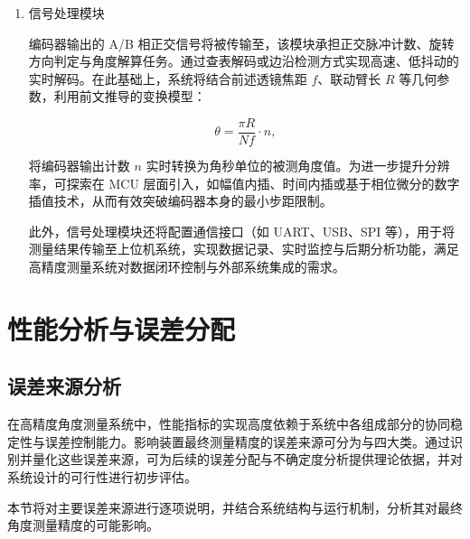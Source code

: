 \begin{enumerate}
	编码器采用非接触式光学检测方式，具备无机械磨损、长期稳定性好等特点，适合高精度微小角度位移测量场景。
	
	\item 信号处理模块
	
	编码器输出的 A/B 相正交信号将被传输至，该模块承担正交脉冲计数、旋转方向判定与角度解算任务。通过查表解码或边沿检测方式实现高速、低抖动的实时解码。在此基础上，系统将结合前述透镜焦距 $f$、联动臂长 $R$ 等几何参数，利用前文推导的变换模型：
	
	$$
	\theta = \frac{\pi R}{N f} \cdot n,
	$$
	
	将编码器输出计数 $n$ 实时转换为角秒单位的被测角度值。为进一步提升分辨率，可探索在 MCU 层面引入，如幅值内插、时间内插或基于相位微分的数字插值技术，从而有效突破编码器本身的最小步距限制。
	
	此外，信号处理模块还将配置通信接口（如 UART、USB、SPI 等），用于将测量结果传输至上位机系统，实现数据记录、实时监控与后期分析功能，满足高精度测量系统对数据闭环控制与外部系统集成的需求。
	
\end{enumerate}

\section{性能分析与误差分配}

\subsection{误差来源分析}

在高精度角度测量系统中，性能指标的实现高度依赖于系统中各组成部分的协同稳定性与误差控制能力。影响装置最终测量精度的误差来源可分为与四大类。通过识别并量化这些误差来源，可为后续的误差分配与不确定度分析提供理论依据，并对系统设计的可行性进行初步评估。

本节将对主要误差来源进行逐项说明，并结合系统结构与运行机制，分析其对最终角度测量精度的可能影响。

